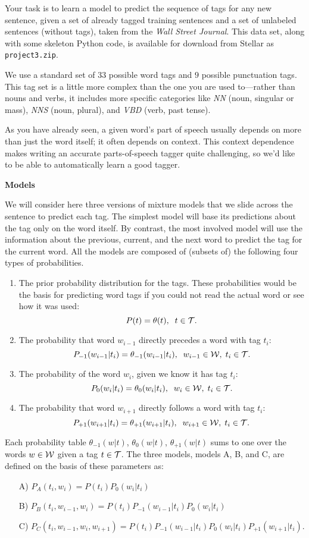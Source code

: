Your task is to learn a model to predict the sequence of tags for any new sentence,
given a set of already tagged training sentences and a set of unlabeled sentences (without tags), taken from the \textit{Wall Street Journal}. This data set, along with some 
skeleton Python code, is available for download from Stellar as \texttt{project3.zip}. 

We use a standard set of $33$ possible word tags and $9$ possible punctuation
tags. This tag set is a little more complex than the one you are used to---rather than
nouns and verbs, it includes more specific categories like \textit{NN} (noun, singular or mass), \textit{NNS} (noun, plural),  and \textit{VBD} (verb, past tense).

As you have already seen, a given word's part of speech usually depends on more than
just the word itself; it often
depends on context. This context dependence makes writing an accurate parts-of-speech
tagger quite challenging,  so we'd like to be able
to automatically learn a good tagger.  

\textbf{Models}

We will consider here three versions of mixture models that we slide across the sentence to predict each tag. The simplest model will base its predictions about the tag only on the word itself. By contrast, the most involved model will use the information about the previous, current, and the next word to predict the tag for the current word. All the models are composed of (subsets of) the following four types of probabilities. 
\begin{enumerate} 
\item The prior probability distribution for the tags. These probabilities would be the basis for  predicting word tags if you could not read the actual word or see how it was used:
\[
P(t) = \theta(t),\;\; t\in {\cal T}.
\] 
\item The probability that word $w_{i-1}$ directly precedes a word with tag $t_i$:
\[
P_{-1}(w_{i-1}|t_i)=\theta_{-1}(w_{i-1}|t_i),\;\; w_{i-1}\in {\cal W},\; t_i\in {\cal T}.
\] 
\item The probability of the word $w_{i}$, given we know it has tag $t_i$:
\[
P_{0}(w_{i}|t_i)=\theta_{0}(w_i|t_i),\;\; w_{i}\in {\cal W},\; t_i\in {\cal T}.
\]
\item The probability that word $w_{i+1}$ directly follows a word with tag $t_i$:
\[
P_{+1}(w_{i+1}|t_i)=\theta_{+1}(w_{i+1}|t_i),\;\; w_{i+1}\in {\cal W},\; t_i\in {\cal T}.
\]
\end{enumerate}
Each probability table $\theta_{-1}(w|t)$, $\theta_{0}(w|t)$, $\theta_{+1}(w|t)$ sums to one over the words $w\in {\cal W}$ given a tag $t\in {\cal T}$. The three models, models A, B, and C, are defined on the basis of these parameters as:
\begin{itemize}
\item[A)] $P_A(t_i,w_i) = P(t_i)P_0(w_i|t_i)$ 
\item[B)] $P_B(t_i,w_{i-1},w_i) = P(t_i)P_{-1}(w_{i-1}|t_i)P_0(w_i|t_i)$ 
\item[C)] $P_C(t_i,w_{i-1},w_i,w_{i+1}) = P(t_i)P_{-1}(w_{i-1}|t_i)P_0(w_i|t_i)P_{+1}(w_{i+1}|t_i).$ 
\end{itemize}

